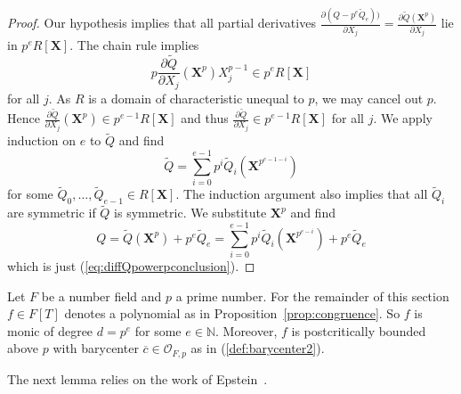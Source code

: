 \documentclass[12pt,oneside,a4]{amsart}
\newcommand{\IN}{\mathbb{N}}
\newcommand{\cO}{\mathcal{O}}
\numberwithin{maincounter}{section}
\numberwithin{equation}{section}
\begin{document}
\begin{proof}
  Our hypothesis
  implies that all partial derivatives
  $\frac{\partial (Q-p^e\tilde Q_e))}{\partial X_j}=\frac{\partial \tilde Q(\boldsymbol{X}^p)}{\partial X_j}$ lie in $p^e
  R[\boldsymbol X]$. The chain rule implies
  \begin{equation*}
    p\frac{\partial \tilde Q}{\partial X_j}(\boldsymbol{X}^p) X_j^{p-1}
    \in p^e R[\boldsymbol X]
  \end{equation*}
  for all $j$. As $R$ is a domain of characteristic unequal to $p$, we
  may cancel out $p$. Hence
  $\frac{\partial \tilde Q}{\partial X_j}(\boldsymbol{X}^p) \in p^{e-1}
  R[\boldsymbol X]$  and thus
  $\frac{\partial \tilde Q}{\partial X_j} \in p^{e-1}
  R[\boldsymbol X]$ for all $j$. We apply induction on $e$ to $\tilde
  Q$ and find
  \begin{equation*}
    \tilde Q = \sum_{i=0}^{e-1} p^i \tilde Q_i (\boldsymbol
    X^{p^{e-1-i}})
  \end{equation*}
  for some $\tilde Q_0,\ldots, \tilde Q_{e-1}\in R[\boldsymbol X]$. The
  induction argument also implies that all $\tilde Q_i$ are symmetric
  if $\tilde Q$ is symmetric. We
  substitute $\boldsymbol X^p$ and find
  \begin{equation*}
    Q = \tilde Q(\boldsymbol{X}^p) + p^e \tilde Q_e =
    \sum_{i=0}^{e-1}  p^i \tilde Q_i(\boldsymbol{X}^{p^{e-i}}) + p^e
    \tilde Q_e
  \end{equation*}
  which is just (\ref{eq:diffQpowerpconclusion}).
\end{proof}

Let $F$ be a number field and $p$ a prime number. 
For the remainder of this section $f\in F[T]$ denotes a polynomial as
in  Proposition~\ref{prop:congruence}.
So $f$ is monic of degree $d=p^e$ for some
 $e\in\IN$. Moreover, $f$
is postcritically bounded above $p$ with barycenter
$\overline c\in \cO_{F,p}$ as in (\ref{def:barycenter2}).

The next lemma relies on the work of  Epstein~\cite{epstein:12}.
\end{document}
